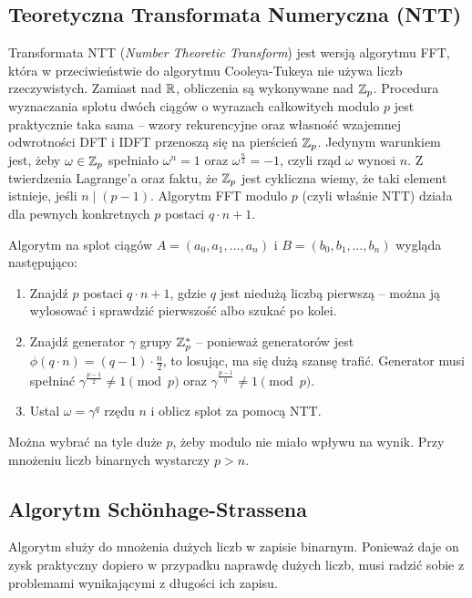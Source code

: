 \subsection{Teoretyczna Transformata Numeryczna (NTT)}
Transformata NTT (\textit{Number Theoretic Transform}) jest wersją algorytmu FFT, która w przeciwieństwie do algorytmu Cooleya-Tukeya nie używa liczb rzeczywistych. Zamiast nad \( \mathbb{R} \), obliczenia są wykonywane nad \( \mathbb{Z}_p \).
Procedura wyznaczania splotu dwóch ciągów o wyrazach całkowitych modulo \( p \) jest praktycznie taka sama -- wzory rekurencyjne oraz własność wzajemnej odwrotności DFT i IDFT przenoszą się na pierścień \( \mathbb{Z}_p \). Jedynym warunkiem jest, żeby \( \omega \in \mathbb{Z}_p \) spełniało \( \omega^n = 1 \) oraz  \( \omega^{\frac{n}{2}} = -1 \), czyli rząd \( \omega \) wynosi \( n \).
Z twierdzenia Lagrange'a oraz faktu, że \( \mathbb{Z}_p \) jest cykliczna wiemy, że taki element istnieje, jeśli \( n \mid (p - 1) \). Algorytm FFT modulo \( p \) (czyli właśnie NTT) działa dla pewnych konkretnych \( p \) postaci \( q \cdot n + 1 \).

Algorytm na splot ciągów \( A = (a_0, a_1, \ldots, a_n) \) i \( B = (b_0, b_1, \ldots, b_n) \) wygląda następująco:
\begin{greyframe}
    \begin{enumerate}
        \item Znajdź \( p \) postaci \( q \cdot n + 1 \), gdzie \( q \) jest niedużą liczbą pierwszą -- można ją wylosować i sprawdzić pierwszość albo szukać po kolei.
        \item Znajdź generator \( \gamma \) grupy \( \mathbb{Z}^{*}_p \) -- ponieważ generatorów jest \( \phi(q \cdot n) = (q - 1) \cdot \frac{n}{2} \), to losując, ma się dużą szansę trafić.
        Generator musi spełniać \( \gamma^{\frac{p-1}{2}} \neq 1 \pmod{p} \) oraz \( \gamma^{\frac{p-1}{q}} \neq 1 \pmod{p} \).
        \item Ustal \( \omega = \gamma^q \) rzędu \( n \) i oblicz splot za pomocą NTT.
    \end{enumerate}
\end{greyframe}
Można wybrać na tyle duże \( p \), żeby modulo nie miało wpływu na wynik. Przy mnożeniu liczb binarnych wystarczy \( p > n \).

\subsection{Algorytm Sch{\"o}nhage-Strassena}
Algorytm służy do mnożenia dużych liczb w zapisie binarnym. Ponieważ daje on zysk praktyczny dopiero w przypadku naprawdę dużych liczb, musi radzić sobie z problemami wynikającymi z długości ich zapisu.

